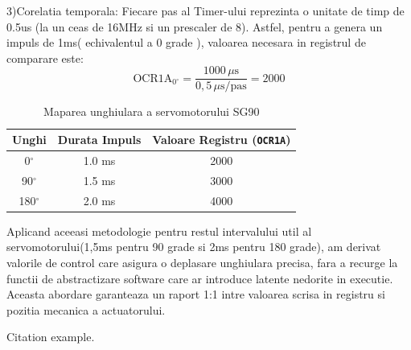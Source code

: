 \documentclass[conference]{IEEEtran}
\begin{document}
 3)Corelatia temporala: Fiecare pas al Timer-ului reprezinta o unitate de timp de 0.5us (la un ceas de 16MHz si un prescaler de 8). Astfel, pentru a genera un impuls de 1ms( echivalentul a 0 grade ), valoarea necesara in registrul de comparare este: 
 \[
\text{OCR1A}_{0^\circ} = \frac{1000\,\mu\text{s}}{0,5\,\mu\text{s/pas}} = 2000
\]
\begin{table}[h]
    \centering
    \begin{tabular}{|c|c|c|}
        \hline
        \textbf{Unghi} & \textbf{Durata Impuls} & \textbf{Valoare Registru (\texttt{OCR1A})} \\ \hline
        0$^{\circ}$    & 1.0 ms               & 2000 \\ \hline
        90$^{\circ}$   & 1.5 ms               & 3000 \\ \hline
        180$^{\circ}$  & 2.0 ms               & 4000 \\ \hline
    \end{tabular}
    \caption{Maparea unghiulara a servomotorului SG90}
\end{table}

Aplicand aceeasi metodologie pentru restul intervalului util al servomotorului(1,5ms pentru 90 grade si 2ms pentru 180 grade), am derivat valorile de control care asigura o deplasare unghiulara precisa, fara a recurge la functii de abstractizare software care ar introduce latente nedorite in executie. Aceasta abordare garanteaza un raport 1:1 intre valoarea scrisa in registru si pozitia mecanica a actuatorului.

Citation example\cite{puente2013review}.


 

\end{document}
